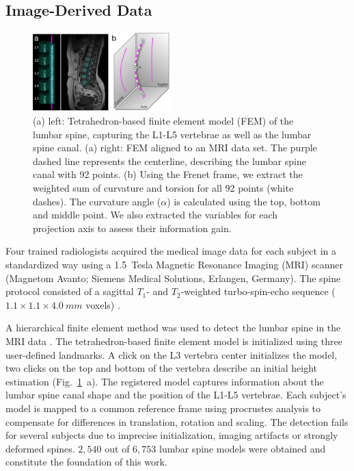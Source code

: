 \documentclass[a4paper,twoside]{style/article}
\begin{document}
\subsection{Image-Derived Data}
\begin{figure}[!h]
  \centering
  \includegraphics[width=0.475\textwidth]{figures/centerline}
  \caption{
	(a) left: Tetrahedron-based finite element model (FEM) of the lumbar spine, capturing the L1-L5 vertebrae as well as the lumbar spine canal.
	(a) right: FEM aligned to an MRI data set.
	The purple dashed line represents the centerline, describing the lumbar spine canal with 92 points.
	(b) Using the Frenet frame, we extract the weighted sum of curvature and torsion for all 92 points (white dashes).
	The curvature angle ($\alpha$) is calculated using the top, bottom and middle point.
	We also extracted the variables for each projection axis to assess their information gain.
	}
  \label{fig:centerline}
\end{figure}
Four trained radiologists acquired the medical image data for each subject in a standardized way using a 1.5~Tesla Magnetic Resonance Imaging (MRI) scanner (Magnetom Avanto; Siemens Medical Solutions, Erlangen, Germany).
The spine protocol consisted of a sagittal $T_1$- and $T_2$-weighted turbo-spin-echo sequence ($1.1\times1.1\times4.0~mm$ voxels) \cite{Hegenscheid2013}.

A hierarchical finite element method was used to detect the lumbar spine in the MRI data \cite{Rak2013}.
The tetrahedron-based finite element model is initialized using three user-defined landmarks.
A click on the L3 vertebra center initializes the model, two clicks on the top and bottom of the vertebra describe an initial height estimation (Fig.~\ref{fig:centerline}~a).
The registered model captures information about the lumbar spine canal shape and the position of the L1-L5 vertebrae.
Each subject's model is mapped to a common reference frame using procrustes analysis to compensate for differences in translation, 
rotation and scaling.
The detection fails for several subjects due to imprecise initialization, imaging artifacts or strongly deformed spines.
$2,540$ out of $6,753$ lumbar spine models were obtained and constitute the foundation of this work.
\end{document}
